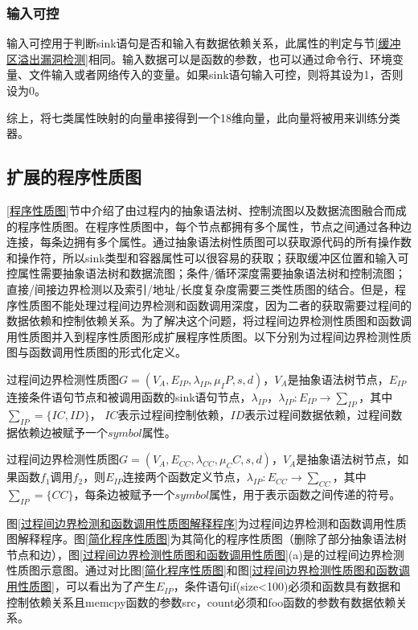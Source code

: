 {\subsubsection{输入可控}

输入可控用于判断sink语句是否和输入有数据依赖关系，此属性的判定与节\ref{缓冲区溢出漏洞检测}相同。输入数据可以是函数的参数，也可以通过命令行、环境变量、文件输入或者网络传入的变量。如果sink语句输入可控，则将其设为1，否则设为0。

综上，将七类属性映射的向量串接得到一个18维向量，此向量将被用来训练分类器。

\subsection{扩展的程序性质图}
\label{扩展的程序性质图}

\ref{程序性质图}节中介绍了由过程内的抽象语法树、控制流图以及数据流图融合而成的程序性质图。在程序性质图中，每个节点都拥有多个属性，节点之间通过各种边连接，每条边拥有多个属性。通过抽象语法树性质图可以获取源代码的所有操作数和操作符，所以sink类型和容器属性可以很容易的获取；获取缓冲区位置和输入可控属性需要抽象语法树和数据流图；条件/循环深度需要抽象语法树和控制流图；直接/间接边界检测以及索引/地址/长度复杂度需要三类性质图的结合。但是，程序性质图不能处理过程间边界检测和函数调用深度，因为二者的获取需要过程间的数据依赖和控制依赖关系。为了解决这个问题，将过程间边界检测性质图和函数调用性质图并入到程序性质图形成扩展程序性质图。以下分别为过程间边界检测性质图与函数调用性质图的形式化定义。

\begin{definition}
 \label{过程间边界检测程序性质图}
 过程间边界检测性质图$G=(V_A,E_{IP},\lambda_{IP} ,\mu_IP, s, d)$，$V_{A}$是抽象语法树节点，$E_{IP}$连接条件语句节点和被调用函数的sink语句节点，$\lambda_{IP}$，$\lambda_{IP}:E_{IP} \rightarrow \sum_{IP}$，其中$\sum_{IP}=\{IC, ID\}$， $IC$表示过程间控制依赖，$ID$表示过程间数据依赖，过程间数据依赖边被赋予一个$symbol$属性。
\end{definition}

\begin{definition}
 \label{函数调用性质图}
 过程间边界检测性质图$G=(V_{A},E_{CC},\lambda_{CC} ,\mu_CC, s, d)$，$V_{A}$是抽象语法树节点，如果函数$f_1$调用$f_2$，则$E_{IP}$连接两个函数定义节点，$\lambda_{IP}:E_{CC} \rightarrow \sum_{CC}$，其中$\sum_{IP}=\{CC\}$，每条边被赋予一个$symbol$属性，用于表示函数之间传递的符号。
\end{definition}

图\ref{过程间边界检测和函数调用性质图解释程序}为过程间边界检测和函数调用性质图解释程序。图\ref{简化程序性质图}为其简化的程序性质图（删除了部分抽象语法树节点和边），图\ref{过程间边界检测性质图和函数调用性质图}(a)是的过程间边界检测性质图示意图。通过对比图\ref{简化程序性质图}和图\ref{过程间边界检测性质图和函数调用性质图}，可以看出为了产生$E_{IP}$，条件语句if(size<100)必须和函数具有数据和控制依赖关系且memcpy函数的参数src，count必须和foo函数的参数有数据依赖关系。

}
